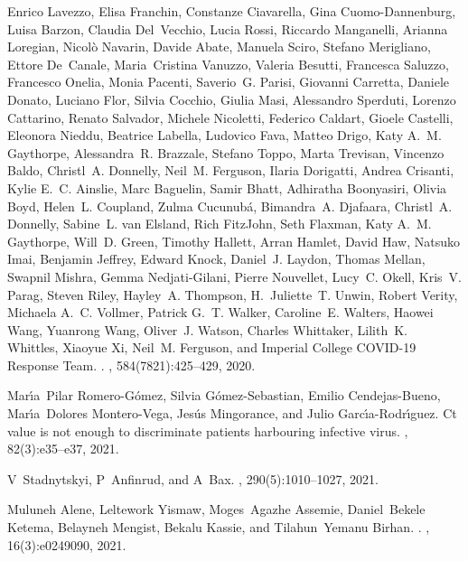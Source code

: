 \documentclass[12pt]{article}
\begin{document}
\begin{thebibliography}{10}
Enrico Lavezzo, Elisa Franchin, Constanze Ciavarella, Gina Cuomo-Dannenburg,
  Luisa Barzon, Claudia Del~Vecchio, Lucia Rossi, Riccardo Manganelli, Arianna
  Loregian, Nicol{\`o} Navarin, Davide Abate, Manuela Sciro, Stefano
  Merigliano, Ettore De~Canale, Maria~Cristina Vanuzzo, Valeria Besutti,
  Francesca Saluzzo, Francesco Onelia, Monia Pacenti, Saverio~G. Parisi,
  Giovanni Carretta, Daniele Donato, Luciano Flor, Silvia Cocchio, Giulia Masi,
  Alessandro Sperduti, Lorenzo Cattarino, Renato Salvador, Michele Nicoletti,
  Federico Caldart, Gioele Castelli, Eleonora Nieddu, Beatrice Labella,
  Ludovico Fava, Matteo Drigo, Katy A.~M. Gaythorpe, Alessandra~R. Brazzale,
  Stefano Toppo, Marta Trevisan, Vincenzo Baldo, Christl~A. Donnelly, Neil~M.
  Ferguson, Ilaria Dorigatti, Andrea Crisanti, Kylie E.~C. Ainslie, Marc
  Baguelin, Samir Bhatt, Adhiratha Boonyasiri, Olivia Boyd, Helen~L. Coupland,
  Zulma Cucunub{\'a}, Bimandra~A. Djafaara, Christl~A. Donnelly, Sabine~L. van
  Elsland, Rich FitzJohn, Seth Flaxman, Katy A.~M. Gaythorpe, Will~D. Green,
  Timothy Hallett, Arran Hamlet, David Haw, Natsuko Imai, Benjamin Jeffrey,
  Edward Knock, Daniel~J. Laydon, Thomas Mellan, Swapnil Mishra, Gemma
  Nedjati-Gilani, Pierre Nouvellet, Lucy~C. Okell, Kris~V. Parag, Steven Riley,
  Hayley~A. Thompson, H.~Juliette~T. Unwin, Robert Verity, Michaela A.~C.
  Vollmer, Patrick G.~T. Walker, Caroline~E. Walters, Haowei Wang, Yuanrong
  Wang, Oliver~J. Watson, Charles Whittaker, Lilith~K. Whittles, Xiaoyue Xi,
  Neil~M. Ferguson, and {Imperial College COVID-19 Response Team}.
.
, 584(7821):425--429, 2020.

Mar{\'\i}a~Pilar Romero-G{\'o}mez, Silvia G{\'o}mez-Sebastian, Emilio
  Cendejas-Bueno, Mar{\'\i}a~Dolores Montero-Vega, Jes{\'u}s Mingorance, and
  Julio Garc{\'\i}a-Rodr{\'\i}guez.
\newblock Ct value is not enough to discriminate patients harbouring infective
  virus.
, 82(3):e35--e37, 2021.

V~Stadnytskyi, P~Anfinrud, and A~Bax.
, 290(5):1010--1027, 2021.

Muluneh Alene, Leltework Yismaw, Moges~Agazhe Assemie, Daniel~Bekele Ketema,
  Belayneh Mengist, Bekalu Kassie, and Tilahun~Yemanu Birhan.
.
, 16(3):e0249090, 2021.


\end{thebibliography}
\end{document}
